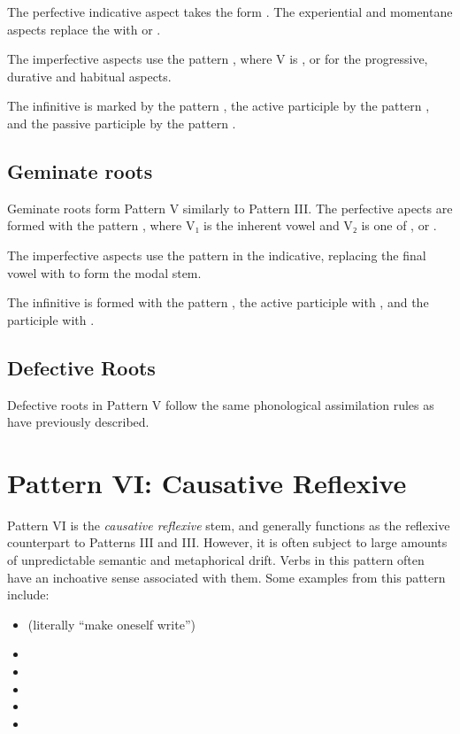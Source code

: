 \documentclass[grammar]{subfiles}
\begin{document}
The perfective indicative aspect takes the form . The
experiential and momentane aspects replace the  with  or .

The imperfective aspects use the pattern , where V is
,  or  for the progressive, durative and habitual aspects.

The infinitive is marked by the pattern , the active participle
by the pattern , and the passive participle by the pattern
.


\subsection{Geminate roots}
\label{ssec:vm_v_geminate_roots}

Geminate roots form Pattern V similarly to Pattern III.   The perfective apects are formed with the pattern
, where V₁ is the inherent vowel and V₂ is one of ,
 or .

The imperfective aspects use the pattern  in the indicative,
replacing the final vowel with  to form the modal stem. 

The infinitive is formed with the pattern , the active participle
with , and the participle with .  


\subsection{Defective Roots}
\label{ssec:vm_v_defective_roots}

Defective roots in Pattern V follow the same phonological assimilation rules
as have previously described. 


\clearpage
\section{Pattern VI: Causative Reflexive}
\label{sec:vm_pattern_vi}

Pattern VI is the \emph{causative reflexive} stem, and generally functions as
the reflexive counterpart to Patterns III and III.  However, it is often subject
to large amounts of unpredictable semantic and metaphorical drift.  Verbs in
this pattern often have an inchoative sense associated with them. Some examples
from this pattern include: 

\begin{itemize}
  \item {} (literally “make oneself write”)
  \item {}
  \item {}
  \item {}
  \item {}
  \item {}
\end{itemize}
\end{document}
